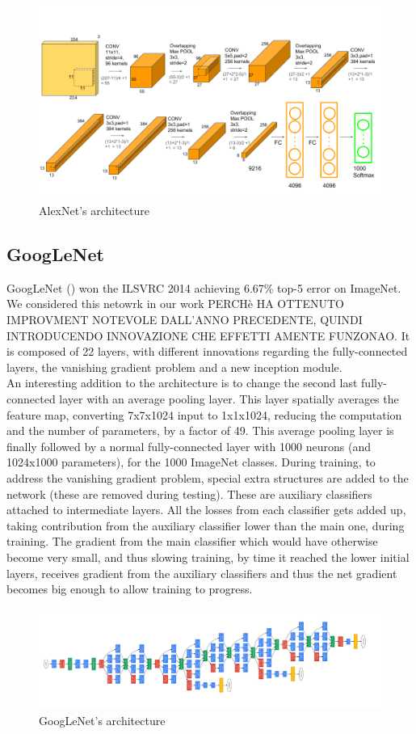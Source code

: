 \documentclass{article}
\begin{document}
\begin{figure}[h]
	\centering
	\includegraphics[width=0.7\linewidth]{image/AlexNet}
	\caption{AlexNet's architecture}
	\label{fig:alexnet}
\end{figure}

\subsection{GoogLeNet}
GoogLeNet (\cite{googlenet}) won the ILSVRC 2014 achieving 6.67\% top-5 error on ImageNet. We considered this netowrk in our work PERCHè HA OTTENUTO IMPROVMENT NOTEVOLE DALL'ANNO PRECEDENTE, QUINDI INTRODUCENDO INNOVAZIONE CHE EFFETTI AMENTE FUNZONAO.
It is composed of 22 layers, with different innovations regarding the fully-connected layers, the vanishing gradient problem and a new inception module.\\
An interesting addition to the architecture is to change the second last fully-connected layer with an average pooling layer. This layer spatially averages the feature map, converting 7x7x1024 input to 1x1x1024, reducing the computation and the number of parameters, by a factor of 49. This average pooling layer is finally followed by a normal fully-connected layer with 1000 neurons (and 1024x1000 parameters), for the 1000 ImageNet classes.
During training, to address the vanishing gradient problem, special extra structures are added to the network (these are removed during testing). These are auxiliary classifiers attached to intermediate layers. All the losses from each classifier gets added up, taking contribution from the auxiliary classifier lower
than the main one, during training. The gradient from the main classifier which would have otherwise become very small, and thus slowing training, by time it reached the lower initial layers, receives gradient from the auxiliary classifiers and thus the net gradient becomes big enough to allow training to progress.
\begin{figure}[h]
	\centering
	\includegraphics[width=0.7\linewidth]{image/GoogLeNet}
	\caption[]{GoogLeNet's architecture}
	\label{fig:googlenet}
\end{figure}
\end{document}
